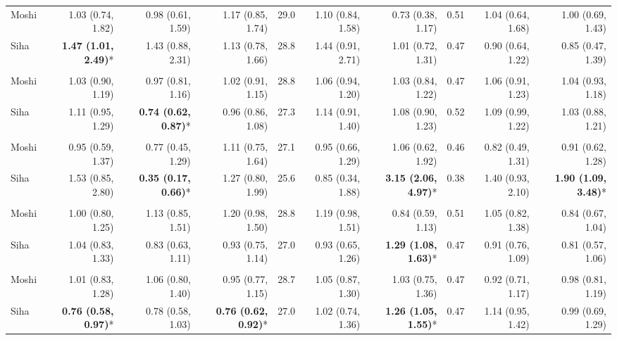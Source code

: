 \begin{table}[t]
\begin{tabular*}{\linewidth}{@{\extracolsep{\fill}}l|rrrrrrrrr}
Moshi & 1.03 (0.74, 1.82) & 0.98 (0.61, 1.59) & 1.17 (0.85, 1.74) & 29.0 & 1.10 (0.84, 1.58) & 0.73 (0.38, 1.17) & 0.51 & 1.04 (0.64, 1.68) & 1.00 (0.69, 1.43) \\ 
Siha & \textbf{1.47 (1.01, 2.49)}* & 1.43 (0.88, 2.31) & 1.13 (0.78, 1.66) & 28.8 & 1.44 (0.91, 2.71) & 1.01 (0.72, 1.31) & 0.47 & 0.90 (0.64, 1.22) & 0.85 (0.47, 1.39) \\ 
\midrule\addlinespace[2.5pt]
\multicolumn{10}{l}{Intestinal Worms} \\[2.5pt] 
\midrule\addlinespace[2.5pt]
Moshi & 1.03 (0.90, 1.19) & 0.97 (0.81, 1.16) & 1.02 (0.91, 1.15) & 28.8 & 1.06 (0.94, 1.20) & 1.03 (0.84, 1.22) & 0.47 & 1.06 (0.91, 1.23) & 1.04 (0.93, 1.18) \\ 
Siha & 1.11 (0.95, 1.29) & \textbf{0.74 (0.62, 0.87)}* & 0.96 (0.86, 1.08) & 27.3 & 1.14 (0.91, 1.40) & 1.08 (0.90, 1.23) & 0.52 & 1.09 (0.99, 1.22) & 1.03 (0.88, 1.21) \\ 
\midrule\addlinespace[2.5pt]
\multicolumn{10}{l}{Neoplasms/Cancer} \\[2.5pt] 
\midrule\addlinespace[2.5pt]
Moshi & 0.95 (0.59, 1.37) & 0.77 (0.45, 1.29) & 1.11 (0.75, 1.64) & 27.1 & 0.95 (0.66, 1.29) & 1.06 (0.62, 1.92) & 0.46 & 0.82 (0.49, 1.31) & 0.91 (0.62, 1.28) \\ 
Siha & 1.53 (0.85, 2.80) & \textbf{0.35 (0.17, 0.66)}* & 1.27 (0.80, 1.99) & 25.6 & 0.85 (0.34, 1.88) & \textbf{3.15 (2.06, 4.97)}* & 0.38 & 1.40 (0.93, 2.10) & \textbf{1.90 (1.09, 3.48)}* \\ 
\midrule\addlinespace[2.5pt]
\multicolumn{10}{l}{Other Cardiovascular Diseases} \\[2.5pt] 
\midrule\addlinespace[2.5pt]
Moshi & 1.00 (0.80, 1.25) & 1.13 (0.85, 1.51) & 1.20 (0.98, 1.50) & 28.8 & 1.19 (0.98, 1.51) & 0.84 (0.59, 1.13) & 0.51 & 1.05 (0.82, 1.38) & 0.84 (0.67, 1.04) \\ 
Siha & 1.04 (0.83, 1.33) & 0.83 (0.63, 1.11) & 0.93 (0.75, 1.14) & 27.0 & 0.93 (0.65, 1.26) & \textbf{1.29 (1.08, 1.63)}* & 0.47 & 0.91 (0.76, 1.09) & 0.81 (0.57, 1.06) \\ 
\midrule\addlinespace[2.5pt]
\multicolumn{10}{l}{Mild/Moderate Anemia} \\[2.5pt] 
\midrule\addlinespace[2.5pt]
Moshi & 1.01 (0.83, 1.28) & 1.06 (0.80, 1.40) & 0.95 (0.77, 1.15) & 28.7 & 1.05 (0.87, 1.30) & 1.03 (0.75, 1.36) & 0.47 & 0.92 (0.71, 1.17) & 0.98 (0.81, 1.19) \\ 
Siha & \textbf{0.76 (0.58, 0.97)}* & 0.78 (0.58, 1.03) & \textbf{0.76 (0.62, 0.92)}* & 27.0 & 1.02 (0.74, 1.36) & \textbf{1.26 (1.05, 1.55)}* & 0.47 & 1.14 (0.95, 1.42) & 0.99 (0.69, 1.29) \\ 

\end{tabular*}
\end{table}
